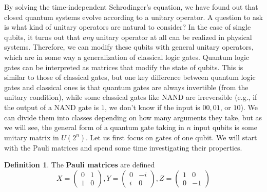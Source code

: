\documentclass{article}
\theoremstyle{definition}
\newtheorem{definition}{Definition}[section]
\begin{document}
    By solving the time-independent Schrodinger's equation, we have found out that closed quantum systems evolve according to a unitary operator. A question to ask is what kind of unitary operators are natural to consider? In the case of single qubits, it turns out that \textit{any} unitary operator at all can be realized in physical systems. Therefore, we can modify these qubits with general unitary operators, which are in some way a generalization of classical logic gates. Quantum logic gates can be interpreted as matrices that modify the state of qubits. This is similar to those of classical gates, but one key difference between quantum logic gates and classical ones is that quantum gates are always invertible (from the unitary condition), while some classical gates like NAND are irreversible (e.g., if the output of a NAND gate is $1$, we don't know if the input is $00, 01$, or $10$). We can divide them into classes depending on how many arguments they take, but as we will see, the general form of a quantum gate taking in $n$ input qubits is some unitary matrix in $U(2^n)$. Let us first focus on gates of one qubit. We will start with the Pauli matrices and spend some time investigating their properties.  

    \begin{definition} 
      The \textbf{Pauli matrices} are defined 
        \[
          X = \begin{pmatrix} 0 & 1 \\ 1 & 0 \end{pmatrix},  
          Y = \begin{pmatrix} 0 & -i \\ i & 0 \end{pmatrix},   
          Z = \begin{pmatrix} 1 & 0 \\ 0 & -1 \end{pmatrix}  
        \]
    \end{definition}
\end{document}

